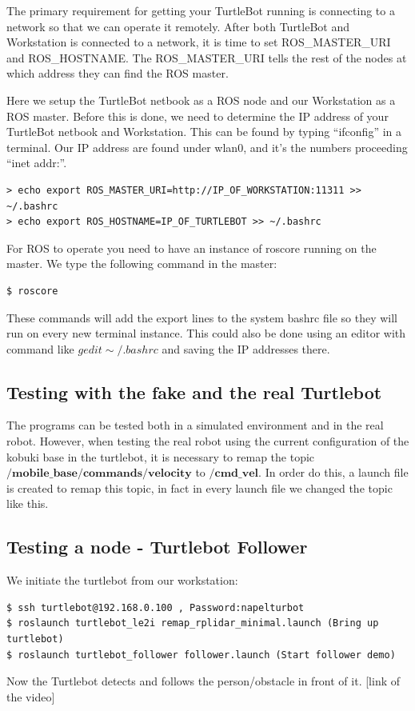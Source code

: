 \documentclass[10pt,a4paper]{article}
\begin{document}
The primary requirement for getting your TurtleBot running is connecting to a network so that we can operate it remotely. After both TurtleBot and Workstation is connected to a network, it is time to set ROS\_MASTER\_URI and ROS\_HOSTNAME. The ROS\_MASTER\_URI tells the rest of the nodes at which address they can find the ROS master.

Here we setup the TurtleBot netbook as a ROS node and our Workstation as a ROS master. Before this is done, we need to determine the IP address of your TurtleBot netbook and Workstation. This can be found by typing ``ifconfig'' in a terminal. Our IP address are found under wlan0, and it's the numbers proceeding ``inet addr:''.

\begin{lstlisting}[frame=single] 
> echo export ROS_MASTER_URI=http://IP_OF_WORKSTATION:11311 >> ~/.bashrc
> echo export ROS_HOSTNAME=IP_OF_TURTLEBOT >> ~/.bashrc
\end{lstlisting}
For ROS to operate you need to have an instance of roscore running on the master. We type the following command in the master:

\begin{lstlisting}[frame=single] 
$ roscore
\end{lstlisting}
These commands will add the export lines to the system bashrc file so they will run on every new terminal instance. This could also be done using an editor with command like $gedit \sim/.bashrc$ and saving the IP addresses there.

\subsection{Testing with the fake and the real Turtlebot}
The programs can be tested both in a simulated environment and in the real robot. However, when testing the real robot using the current configuration of the kobuki base in the turtlebot, it is necessary to remap the topic $\textbf{/mobile\_base/commands/velocity}$ to $/\textbf{cmd\_vel}$. In order do this, a launch file is created to remap this topic, in fact in every launch file we changed the topic like this.

\subsection{Testing a node - Turtlebot Follower}
We initiate the turtlebot from our workstation:
\begin{lstlisting}[frame=single]
$ ssh turtlebot@192.168.0.100 , Password:napelturbot
$ roslaunch turtlebot_le2i remap_rplidar_minimal.launch (Bring up turtlebot)
$ roslaunch turtlebot_follower follower.launch (Start follower demo)
\end{lstlisting}
Now the Turtlebot detects and follows the person/obstacle in front of it.
[link of the video]
\end{document}
